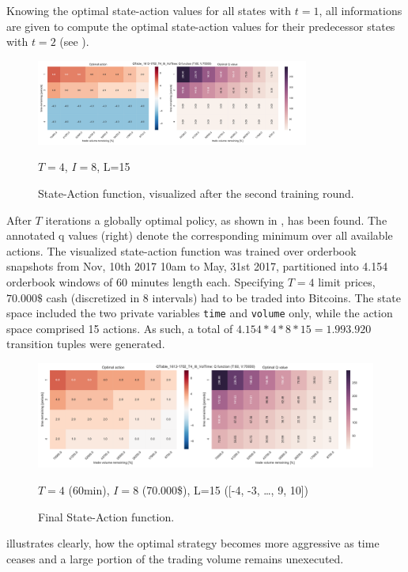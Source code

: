 Knowing the optimal state-action values for all states with $t=1$, all informations are given to compute the optimal state-action values for their predecessor states with $t=2$ (see ).

\begin{figure}[ht]
	\centering
   \includegraphics[width=0.8\textwidth]{content/drawings/heatmap_3months_t2}
	\caption{State-Action function, visualized after the second training round.}
	$T=4$, $I=8$, L=15
	\label{fig:heatmap:t2}
\end{figure}

After $T$ iterations a globally optimal policy, as shown in , has been found. The annotated q values (right) denote the corresponding minimum over all available actions. The visualized state-action function was trained over orderbook snapshots from Nov, 10th 2017 10am to May, 31st 2017, partitioned into 4.154 orderbook windows of 60 minutes length each. Specifying $T=4$ limit prices, $70.000\$$ cash (discretized in 8 intervals) had to be traded into Bitcoins. The state space included the two private variables \lstinline!time! and \lstinline!volume! only, while the action space comprised 15 actions. As such, a total of $4.154 * 4 * 8 * 15 = 1.993.920$ transition tuples were generated.

\begin{figure}[ht]
	\centering
   \includegraphics[width=1.\textwidth]{content/drawings/heatmap_3months}
	\caption{Final State-Action function.}
	$T=4$ (60min), $I=8$ (70.000\$), L=15 ([-4, -3, \ldots{}, 9, 10])
	\label{fig:heatmap}
\end{figure}

 illustrates clearly, how the optimal strategy becomes more aggressive as time ceases and a large portion of the trading volume remains unexecuted.

